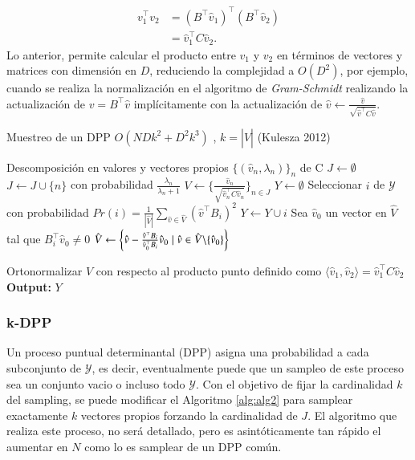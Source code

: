 \begin{align*}
    v_1^{\top}v_2 & = (B^{\top}\hat{v}_1)^{\top}(B^{\top}\hat{v}_2) \\
    & = \hat{v}_1^{\top}C\hat{v}_2.
\end{align*}
Lo anterior, permite calcular el producto entre $v_1$ y $v_2$ en términos de vectores y matrices con dimensión en $D$, reduciendo la complejidad a $O(D^2)$, por ejemplo, cuando se realiza la normalización en el algoritmo de \textit{Gram-Schmidt} realizando la actualización de $v = B^{\top}\hat{v}$ implícitamente con la actualización de $\hat{v} \gets \frac{\hat{v}}{\sqrt{\hat{v}^{\top}C\hat{v}}}$.

\begin{algorithm}
\caption{Muestreo de un DPP $O(NDk^2 + D^2k^3)$      , $k = |\hat{V}|$ (Kulesza 2012)}\label{alg:alg2}
\begin{algorithmic}
\Require Descomposición en valores y vectores propios 
$\{(\hat{v}_n , \lambda_n)\}_{n}$ de C
\State $J \gets \emptyset$
\State $J \gets J \cup \{n\}$ con probabilidad $\frac{\lambda_n}{\lambda_n+1}$
\EndFor
\State $V \gets \{ \frac{\hat{v}_n}{\sqrt{\hat{v}_n^{\top} C \hat{v}_n}} \}_{n \in J}$
\State $Y \gets \emptyset$
\State Seleccionar $i$ de $\mathcal{Y}$ con probabilidad $Pr(i) = \frac{1}{|\hat{V}|}\sum_{\hat{v} \in \hat{V}}(\hat{v}^{\top}B_i)^2$ 
\State $Y \gets Y \cup i$
\State Sea $\hat{v}_0$ un vector en $\hat{V}$ tal que $B_i^{\top}\hat{v}_0 \neq 0$
\State $\hat{V} \gets \left \{\hat{v} - \frac{\hat{v}^{\top}B_i}{\hat{v}_0^{\top}B_i}\hat{v}_0 \hspace{0.1cm}| \hspace{0.1cm} \hat{v} \in \hat{V} \backslash \{\hat{v}_0\} \right \}$

\State Ortonormalizar $\hat{V}$ con respecto al producto punto definido como $\langle \hat{v}_1 , \hat{v}_2 \rangle = \hat{v}_1^{\top}C\hat{v}_2$
\EndWhile   
\State \textbf{Output: } $Y$
\end{algorithmic}
\end{algorithm}

\subsubsection{k-DPP}

Un proceso puntual determinantal (DPP) asigna una probabilidad a cada subconjunto de $\mathcal{Y}$, es decir, eventualmente puede que un sampleo de este proceso sea un conjunto vacio o incluso todo $\mathcal{Y}$. Con el objetivo de fijar la cardinalidad $k$ del sampling, se puede modificar el Algoritmo \ref{alg:alg2} para samplear exactamente $k$ vectores propios forzando la cardinalidad de $J$. 
El algoritmo que realiza este proceso, no será detallado, pero es asintóticamente tan rápido el aumentar en $N$ como lo es samplear de un DPP común. 

